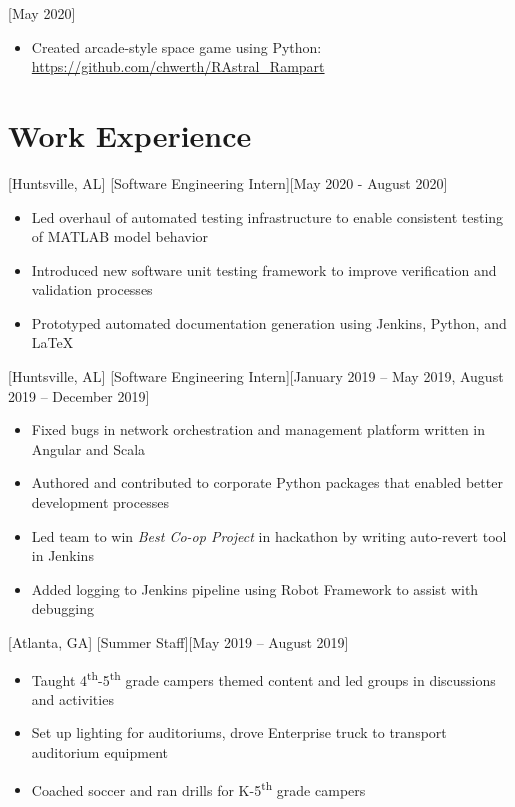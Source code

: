 \documentclass[hidelinks, 11pt]{article}
\newcommand{\link}[1]{{\color{blue}\href{#1}{#1}}}
\begin{document}
[May 2020]

\begin{itemize}
  \item Created arcade-style space game using Python: \link{https://github.com/chwerth/RAstral\_Rampart}
\end{itemize}\leavevmode

\section{Work Experience}

[Huntsville, AL]
[Software Engineering Intern][May 2020 - August 2020]

\begin{itemize}
  \item Led overhaul of automated testing infrastructure to enable consistent testing of MATLAB model behavior
  \item Introduced new software unit testing framework to improve verification and validation processes
  \item Prototyped automated documentation generation using Jenkins, Python, and LaTeX
\end{itemize}

[Huntsville, AL]
[Software Engineering Intern][January 2019 – May 2019, August 2019 – December 2019]

\begin{itemize}
  \item Fixed bugs in network orchestration and management platform written in Angular and Scala
  \item Authored and contributed to corporate Python packages that enabled better development processes
  \item Led team to win \textit{Best Co-op Project} in hackathon by writing auto-revert tool in Jenkins
  \item Added logging to Jenkins pipeline using Robot Framework to assist with debugging
\end{itemize}

[Atlanta, GA]
[Summer Staff][May 2019 – August 2019]

\begin{itemize}
  \item Taught 4\textsuperscript{th}-5\textsuperscript{th} grade campers themed content and led groups in discussions and activities
  \item Set up lighting for auditoriums, drove Enterprise truck to transport auditorium equipment
  \item Coached soccer and ran drills for K-5\textsuperscript{th} grade campers
\end{itemize}
\end{document}
